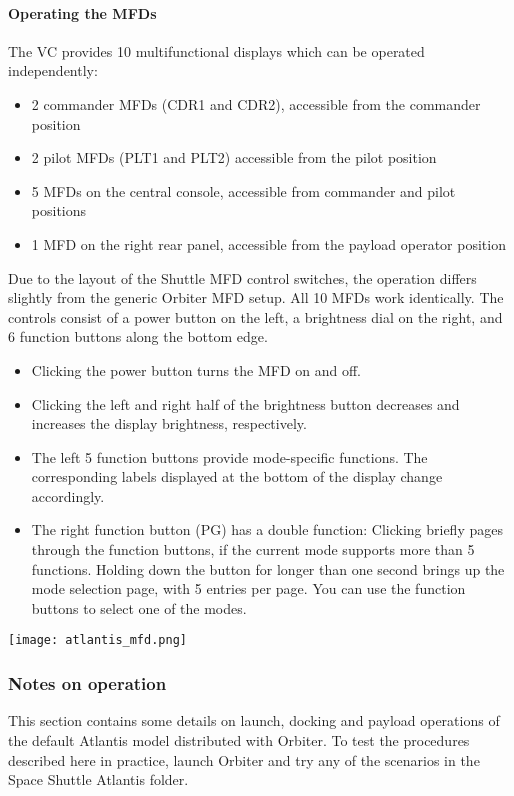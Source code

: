 \documentclass[Orbiter User Manual.tex]{subfiles}
\begin{document}
\paragraph{Operating the MFDs}
The VC provides 10 multifunctional displays which can be operated independently:
\begin{itemize}
\item 2 commander MFDs (CDR1 and CDR2), accessible from the commander position
\item 2 pilot MFDs (PLT1 and PLT2) accessible from the pilot position
\item 5 MFDs on the central console, accessible from commander and pilot positions
\item 1 MFD on the right rear panel, accessible from the payload operator position
\end{itemize}
Due to the layout of the Shuttle MFD control switches, the operation differs slightly from the generic Orbiter MFD setup. All 10 MFDs work identically. The controls consist of a power button on the left, a brightness dial on the right, and 6 function buttons along the bottom edge.
\begin{itemize}
\item Clicking the power button turns the MFD on and off.
\item Clicking the left and right half of the brightness button decreases and increases the display brightness, respectively.
\item The left 5 function buttons provide mode-specific functions. The corresponding labels displayed at the bottom of the display change accordingly.
\item The right function button (PG) has a double function: Clicking briefly pages through the function buttons, if the current mode supports more than 5 functions. Holding down the button for longer than one second brings up the mode selection page, with 5 entries per page. You can use the function buttons to select one of the modes.
\end{itemize}
\begin{center}
\texttt{[image: atlantis\_mfd.png]}
\end{center}

\subsubsection{Notes on operation}
This section contains some details on launch, docking and payload operations of the default Atlantis model distributed with Orbiter. To test the procedures described here in practice, launch Orbiter and try any of the scenarios in the Space Shuttle Atlantis folder.
\end{document}
